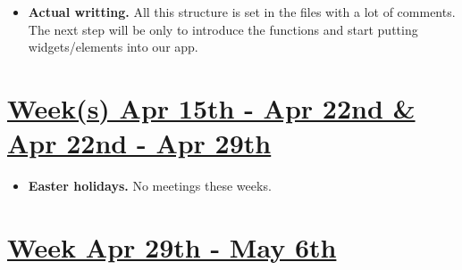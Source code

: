 \documentclass{article}
\begin{document}
\begin{itemize}
	\item \textbf{Actual writting.} All this structure is set in the files with a lot of comments. The next step will be only to introduce the functions and start putting widgets/elements into our app.

\end{itemize}
\section*{\underline{Week(s) Apr 15th - Apr 22nd \& Apr 22nd - Apr 29th}}
\begin{itemize}
	\item \textbf{Easter holidays.} No meetings these weeks.
\end{itemize}
\section*{\underline{Week Apr 29th - May 6th}}
\end{document}
